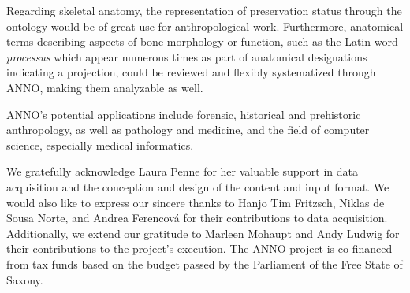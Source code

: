 \documentclass[sw]{iosart2x}
\newcommand{\latin}[1]{\emph{#1}}
\begin{document}
Regarding skeletal anatomy, the representation of preservation status through the ontology would be of great use for anthropological work.
Furthermore, anatomical terms describing aspects of bone morphology or function, such as the Latin word \latin{processus} which appear numerous times as part of anatomical designations indicating a projection, could be reviewed and flexibly systematized through ANNO, making them analyzable as well.

ANNO's potential applications include forensic, historical and prehistoric anthropology, as well as pathology and medicine, and the field of computer science, especially medical informatics.

\begin{ack}
\noindent\begin{minipage}{0.90\textwidth}
We gratefully acknowledge Laura Penne for her valuable support in data acquisition and the conception and design of the content and input format.
We would also like to express our sincere thanks to Hanjo Tim Fritzsch, Niklas de Sousa Norte, and Andrea Ferencová for their contributions to data acquisition.
Additionally, we extend our gratitude to Marleen Mohaupt and Andy Ludwig for their contributions to the project's execution.
The ANNO project is co-financed from tax funds based on the budget passed by the Parliament of the Free State of Saxony.


\end{minipage}
\end{ack}
\end{document}
